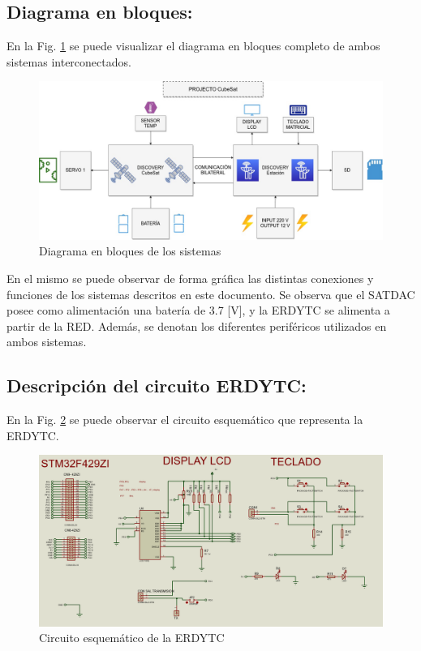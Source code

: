 \documentclass[conference]{IEEEtran}
\begin{document}
\subsection{Diagrama en bloques:}
\label{sec:orgea1461d}
En la Fig. \ref{fig:diagramaBloques} se puede visualizar el diagrama en bloques completo de ambos sistemas interconectados.

\begin{figure}[htbp]
\centering
\includegraphics[width=.9\linewidth]{../../images/diagramaBloques.jpg}
\caption{\label{fig:diagramaBloques}Diagrama en bloques de los sistemas}
\end{figure}

En el mismo se puede observar de forma gráfica las distintas conexiones y funciones de los sistemas descritos en este documento. Se observa que el SATDAC posee como alimentación una batería de 3.7 [V], y la ERDYTC se alimenta a partir de la RED. Además, se denotan los diferentes periféricos utilizados en ambos sistemas.
\subsection{Descripción del circuito ERDYTC:}
\label{sec:org7083e39}
En la Fig. \ref{fig:estacionEsquematico} se puede observar el circuito esquemático que representa la ERDYTC.

\begin{figure}[htbp]
\centering
\includegraphics[width=.9\linewidth]{../../images/estacionEsquematico.png}
\caption{\label{fig:estacionEsquematico}Circuito esquemático de la ERDYTC}
\end{figure}
\end{document}
